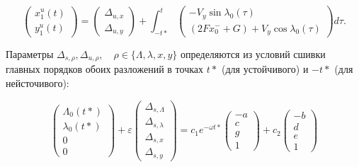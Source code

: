 \begin{equation}
    \begin{pmatrix} x_1^u(t) \\ y_1^u(t) \end{pmatrix}
    = 
    \begin{pmatrix} \Delta_{u,x} \\ \Delta_{u,y} \end{pmatrix}
    + \int_{-t*}^{t} \begin{pmatrix} -V_y \sin \lambda_0(\tau) \\ (2F x_0^- + G) + V_y \cos \lambda_0(\tau) \end{pmatrix} d\tau.
    \label{su1}
\end{equation}

Параметры $\Delta_{s, \rho}, \Delta_{u, \rho}, \quad \rho \in \{ \Lambda,\lambda,x,y\}$ определяются из условий сшивки главных порядков обоих разложений в точках $t*$ (для устойчивого) и $-t*$ (для нейсточивого):

\begin{equation}
\begin{pmatrix}
\Lambda_0(t*) \\ \lambda_0(t*) \\ 0 \\ 0
\end{pmatrix}
+ \varepsilon 
\begin{pmatrix}
\Delta_{s,\Lambda} \\ \Delta_{s,\lambda} \\ \Delta_{s,x} \\ \Delta_{s,y}
\end{pmatrix}
=
c_1 e^{- \omega t*}
\begin{pmatrix}
-a \\ c \\ g \\ 1
\end{pmatrix}
+ c_2
\begin{pmatrix}
-b \\ d \\ e \\ 1
\end{pmatrix}
\end{equation}

